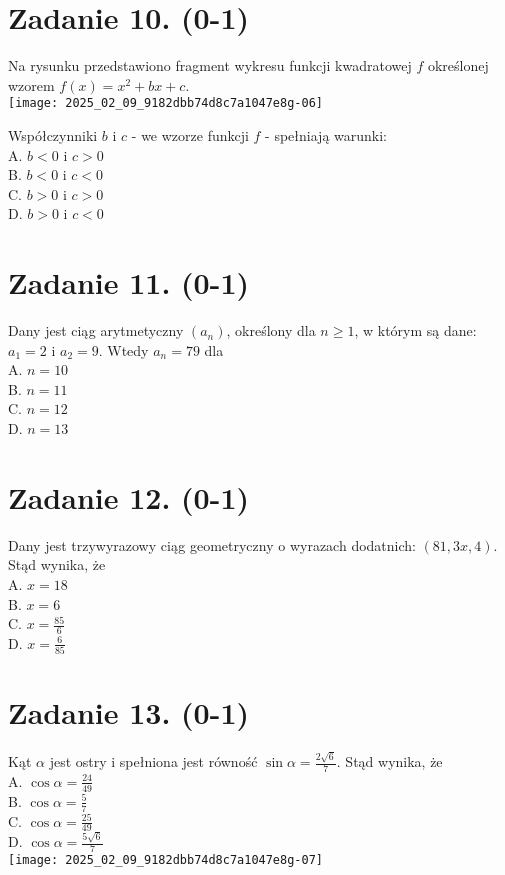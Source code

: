 \documentclass[10pt]{article}
\begin{document}
\section*{Zadanie 10. (0-1)}
Na rysunku przedstawiono fragment wykresu funkcji kwadratowej \(f\) określonej wzorem \(f(x)=x^{2}+b x+c\).\\
\texttt{[image: 2025\_02\_09\_9182dbb74d8c7a1047e8g-06]}

Współczynniki \(b\) i \(c\) - we wzorze funkcji \(f\) - spełniają warunki:\\
A. \(b<0\) i \(c>0\)\\
B. \(b<0\) i \(c<0\)\\
C. \(b>0\) i \(c>0\)\\
D. \(b>0\) i \(c<0\)

\section*{Zadanie 11. (0-1)}
Dany jest ciąg arytmetyczny \(\left(a_{n}\right)\), określony dla \(n \geq 1\), w którym są dane: \(a_{1}=2\) i \(a_{2}=9\). Wtedy \(a_{n}=79\) dla\\
A. \(n=10\)\\
B. \(n=11\)\\
C. \(n=12\)\\
D. \(n=13\)

\section*{Zadanie 12. (0-1)}
Dany jest trzywyrazowy ciąg geometryczny o wyrazach dodatnich: \((81,3 x, 4)\). Stąd wynika, że\\
A. \(x=18\)\\
B. \(x=6\)\\
C. \(x=\frac{85}{6}\)\\
D. \(x=\frac{6}{85}\)

\section*{Zadanie 13. (0-1)}
Kąt \(\alpha\) jest ostry i spełniona jest równość \(\sin \alpha=\frac{2 \sqrt{6}}{7}\). Stąd wynika, że\\
A. \(\cos \alpha=\frac{24}{49}\)\\
B. \(\cos \alpha=\frac{5}{7}\)\\
C. \(\cos \alpha=\frac{25}{49}\)\\
D. \(\cos \alpha=\frac{5 \sqrt{6}}{7}\)\\
\texttt{[image: 2025\_02\_09\_9182dbb74d8c7a1047e8g-07]}
\end{document}

